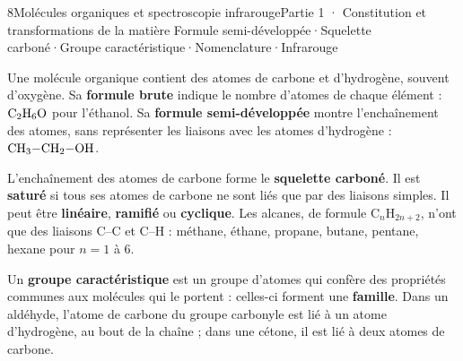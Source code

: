 \begin{ouverture}[infrarouge]{8}{Molécules organiques et spectroscopie infrarouge}{Partie 1 · Constitution et transformations de la matière}
{Formule semi-développée\enspace·\enspace Squelette carboné\enspace·\enspace Groupe caractéristique\enspace·\enspace Nomenclature\enspace·\enspace Infrarouge}
\end{ouverture}
\essentiel
{}
\begin{definition}
Une molécule organique contient des atomes de carbone et d'hydrogène, souvent d'oxygène. Sa \textbf{formule brute} indique le
nombre d'atomes de chaque élément : $\ce{C2H6O}$ pour l'éthanol. Sa \textbf{formule semi-développée} montre l'enchaînement des
atomes, sans représenter les liaisons avec les atomes d'hydrogène : $\ce{CH3-CH2-OH}$.
\end{definition}
\begin{definition}
L'enchaînement des atomes de carbone forme le \textbf{squelette carboné}. Il est \textbf{saturé} si tous ses atomes de carbone ne
sont liés que par des liaisons simples. Il peut être \textbf{linéaire}, \textbf{ramifié} ou \textbf{cyclique}. Les alcanes, de formule
$\mathrm{C}_n\mathrm{H}_{2n+2}$, n'ont que des liaisons C--C et C--H : méthane, éthane, propane, butane, pentane, hexane pour $n=1$ à 6.
\end{definition}
\begin{propriete}
Un \textbf{groupe caractéristique} est un groupe d'atomes qui confère des propriétés communes aux molécules qui le portent :
celles-ci forment une \textbf{famille}. Dans un aldéhyde, l'atome de carbone du groupe carbonyle est lié à un atome
d'hydrogène, au bout de la chaîne ; dans une cétone, il est lié à deux atomes de carbone.
\end{propriete}
